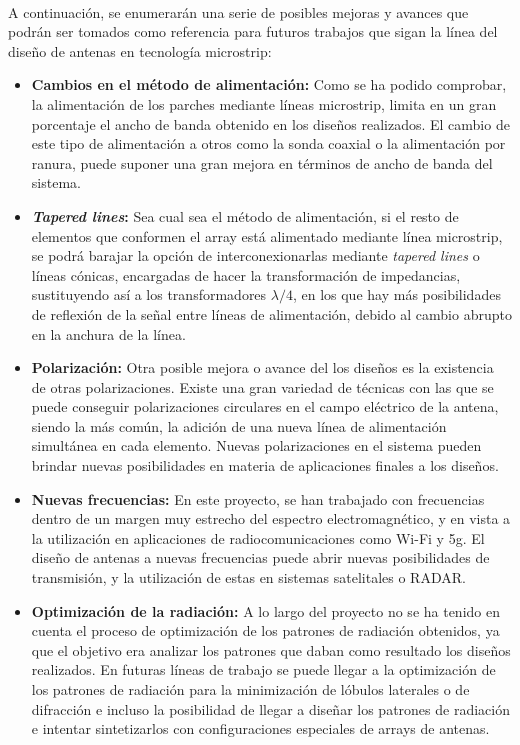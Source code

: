 \\
\par A continuación, se enumerarán una serie de posibles mejoras y avances que podrán ser tomados como referencia para futuros trabajos que sigan la línea del diseño de antenas en tecnología microstrip:
\\
\begin{itemize}
\item \textbf{Cambios en el método de alimentación: }Como se ha podido comprobar, la alimentación de los parches mediante líneas microstrip, limita en un gran porcentaje el ancho de banda obtenido en los diseños realizados. El cambio de este tipo de alimentación a otros como la sonda coaxial o la alimentación por ranura, puede suponer una gran mejora en términos de ancho de banda del sistema. 
\item \textbf{\textit{Tapered lines}: }Sea cual sea el método de alimentación, si el resto de elementos que conformen el array está alimentado mediante línea microstrip, se podrá barajar la opción de interconexionarlas mediante \textit{tapered lines} o líneas cónicas, encargadas de hacer la transformación de impedancias, sustituyendo así a los transformadores $\lambda/4$, en los que hay más posibilidades de reflexión de la señal entre líneas de alimentación, debido al cambio abrupto en la anchura de la línea.
\item \textbf{Polarización: }Otra posible mejora o avance del los diseños es la existencia de otras polarizaciones. Existe una gran variedad de técnicas con las que se puede conseguir polarizaciones circulares en el campo eléctrico de la antena, siendo la más común, la adición de una nueva línea de alimentación simultánea en cada elemento. Nuevas polarizaciones en el sistema pueden brindar nuevas posibilidades en materia de aplicaciones finales a los diseños.
\item \textbf{Nuevas frecuencias: }En este proyecto, se han trabajado con frecuencias dentro de un margen muy estrecho del espectro electromagnético, y en vista a la utilización en aplicaciones de radiocomunicaciones como Wi-Fi y \gls{5g}. El diseño de antenas a nuevas frecuencias puede abrir nuevas posibilidades de transmisión, y la utilización de estas en sistemas satelitales o RADAR.
\item \textbf{Optimización de la radiación: }A lo largo del proyecto no se ha tenido en cuenta el proceso de optimización de los patrones de radiación obtenidos, ya que el objetivo era analizar los patrones que daban como resultado los diseños realizados. En futuras líneas de trabajo se puede llegar a la optimización de los patrones de radiación para la minimización de lóbulos laterales o de difracción e incluso la posibilidad de llegar a diseñar los patrones de radiación e intentar sintetizarlos con configuraciones especiales de arrays de antenas.
\end{itemize}
